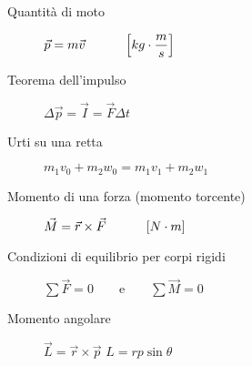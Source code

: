 \documentclass[a4paper,11pt,italian]{article}
\begin{document}
\begin{description}
  \item[Quantità di moto] 
  $ \vec{p} = m \vec{v} \hspace*{3em} \left[ kg \cdot \dfrac{m}{s} \right] $ 
  
  \item[Teorema dell'impulso] 
  $ \Delta \vec{p} = \vec{I} = \vec{F} \Delta t $
  
  \item[Urti su una retta] 
  $ m_1 v_0 + m_2 w_0 = m_1 v_1 + m_2 w_1 $
%   
%   
%   
  
  \item[Momento di una forza (momento torcente)]
  $ \vec{M} = \vec{r} \times \vec{F} \hspace*{3em} \left[ N \cdot m \right] $
  
  \item[Condizioni di equilibrio per corpi rigidi]
  $ \sum \vec{F} = 0 \quad\quad\textrm{e}\quad\quad \sum \vec{M} = 0 $

  \item[Momento angolare] 
  
  $ \vec{L} = \vec{r} \times \vec{p} $
  $ L = rp\sin\theta $
  

\end{description}
\end{document}
